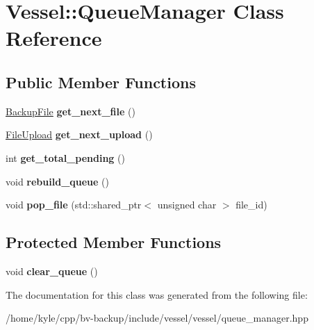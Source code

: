 \hypertarget{class_vessel_1_1_queue_manager}{}\section{Vessel\+:\+:Queue\+Manager Class Reference}
\label{class_vessel_1_1_queue_manager}
\subsection*{Public Member Functions}
\begin{DoxyCompactItemize}
\item 
\mbox{\label{class_vessel_1_1_queue_manager_af1a072eaf9108bea0266a08b042ab252}} 
\hyperlink{class_vessel_1_1_file_1_1_backup_file}{Backup\+File} {\bfseries get\+\_\+next\+\_\+file} ()
\item 
\mbox{\label{class_vessel_1_1_queue_manager_a8a6de1b9b302492c4338972bd3317d85}} 
\hyperlink{class_vessel_1_1_file_1_1_file_upload}{File\+Upload} {\bfseries get\+\_\+next\+\_\+upload} ()
\item 
\mbox{\label{class_vessel_1_1_queue_manager_a4f3542c47ab942e96c0ef98c5fb211a0}} 
int {\bfseries get\+\_\+total\+\_\+pending} ()
\item 
\mbox{\label{class_vessel_1_1_queue_manager_a1e531c84c86275602b9408a0b3610a5a}} 
void {\bfseries rebuild\+\_\+queue} ()
\item 
\mbox{\label{class_vessel_1_1_queue_manager_a3dfc89163a5c341b97e5ee5e5f31521a}} 
void {\bfseries pop\+\_\+file} (std\+::shared\+\_\+ptr$<$ unsigned char $>$ file\+\_\+id)
\end{DoxyCompactItemize}
\subsection*{Protected Member Functions}
\begin{DoxyCompactItemize}
\item 
\mbox{\label{class_vessel_1_1_queue_manager_a47b7e3dd74d0580204fd8ee37e099f99}} 
void {\bfseries clear\+\_\+queue} ()
\end{DoxyCompactItemize}


The documentation for this class was generated from the following file\+:\begin{DoxyCompactItemize}
\item 
/home/kyle/cpp/bv-\/backup/include/vessel/vessel/queue\+\_\+manager.\+hpp\end{DoxyCompactItemize}
